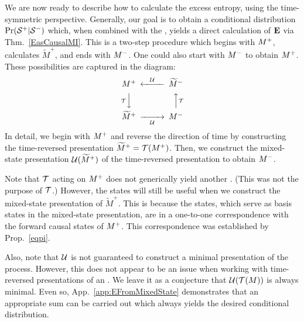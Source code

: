We are now ready to describe how to calculate the excess entropy, using the
time-symmetric perspective. Generally, our goal is to obtain a conditional
distribution $\Pr({\mathcal{S}}^{+}|{\mathcal{S}}^{-})$ which, when combined
with the \eMs, yields a direct calculation of ${\bf E}$ via Thm.~\ref{EasCausalMI}.
This is a two-step procedure which begins with ${M}^{+}$, calculates
$\widetilde{M}^+$, and ends with ${M}^{-}$. One could also start with ${M}^{-}$
to obtain ${M}^{+}$. These possibilities are captured in the diagram:
\begin{equation}
\begin{CD}
\FutureEM @<\MSP<< \widetilde{M}^-\\
@V\TR{}VV             @AA\TR{}A\\
\widetilde{M}^+ @>>\MSP> \PastEM
\end{CD}
\end{equation}
In detail, we begin with ${M}^{+}$ and reverse the direction of time by 
constructing the time-reversed presentation $\widetilde{M}^+ = \mathcal{T}({M}^{+})$.
Then, we construct the mixed-state presentation $\mathcal{U}(\widetilde{M}^+)$ of the
time-reversed presentation to obtain ${M}^{-}$.

Note that $\mathcal{T}$ acting on ${M}^{+}$ does not generically yield another \eM.
(This was not the purpose of $\mathcal{T}$.) However, the states will still be useful
when we construct the mixed-state presentation of $\widetilde{M}^+$. This is
because the states, which serve as basis states in the mixed-state presentation,
are in a one-to-one correspondence with the forward causal states of
${M}^{+}$. This correspondence was established by Prop.~\ref{eqpi}.

Also, note that $\mathcal{U}$ is not guaranteed to construct a minimal presentation 
of the process. However, this does not appear to be an issue when working with
time-reversed presentations of an \eM. We leave it as a conjecture that
$\mathcal{U}(\mathcal{T}(M))$ is always minimal. Even so, App.~\ref{app:EFromMixedState} demonstrates that an
appropriate sum can be carried out which always yields the desired conditional
distribution.


